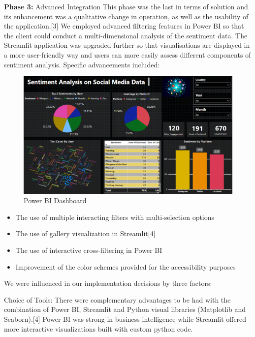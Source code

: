 \documentclass[conference]{IEEEtran}
\begin{document}
\textbf{Phase 3:} Advanced Integration This phase was the last in terms of solution and its enhancement was a qualitative change in operation, as well as the usability of the application.[3] We employed advanced filtering features in Power BI so that the client could conduct a multi-dimensional analysis of the sentiment data. The Streamlit application was upgraded further so that visualisations are displayed in a more user-friendly way and users can more easily assess different components of sentiment analysis. Specific advancements included: 

\begin{figure}
    \centering
    \includegraphics[width=1\linewidth]{socialmedia.png}
    \caption{Power BI Dashboard}
    \label{fig:enter-label}
\end{figure}

\begin{itemize}
    \item The use of multiple interacting filters with multi-selection options
    \item The use of gallery visualization in Streamlit[4]
    \item The use of interactive cross-filtering in Power BI
    \item Improvement of the color schemes provided for the accessibility purposes
\end{itemize}

We were influenced in our implementation decisions by three factors:

Choice of Tools: There were complementary advantages to be had with the combination of Power BI, Streamlit and Python visual libraries (Matplotlib and Seaborn).[4] Power BI was strong in business intelligence while Streamlit offered more interactive visualizations built with custom python code.
\end{document}
